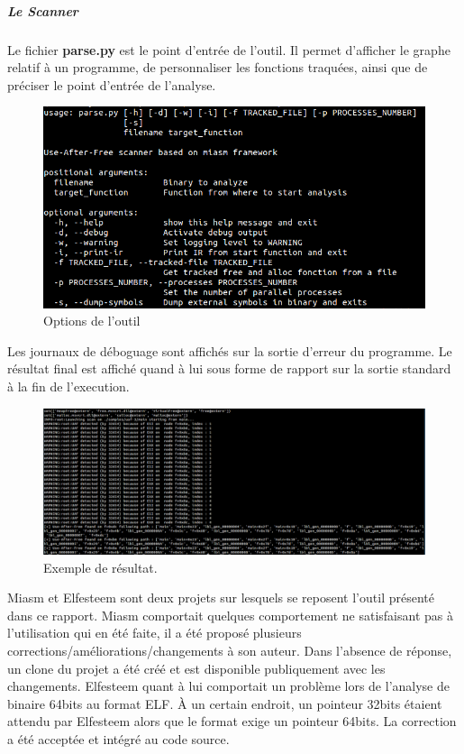 \subparagraph{Le Scanner}
Le fichier \textbf{parse.py} est le point d'entrée de l'outil. Il permet d'afficher le graphe relatif à un programme, de personnaliser les fonctions traquées, ainsi que de préciser
le point d'entrée de l'analyse.
\begin{figure}[h]
    \centering
    \includegraphics[scale=0.3]{options-parse.png}\newline
    \caption{Options de l'outil}
\end{figure}
Les journaux de déboguage sont affichés sur la sortie d'erreur du programme. Le résultat final est affiché quand à lui sous forme de rapport sur la sortie standard à la fin de l'execution.
\begin{figure}[h]
    \centering
    \includegraphics[scale=0.3]{results.png}\newline
    \caption{Exemple de résultat.}
\end{figure}
Miasm et Elfesteem sont deux projets sur lesquels se reposent l'outil présenté dans ce rapport. Miasm comportait quelques comportement ne satisfaisant pas à l'utilisation qui en été faite,
il a été proposé plusieurs corrections/améliorations/changements à son auteur. Dans l'absence de réponse, un clone du projet a été créé et est disponible publiquement avec les changements.
Elfesteem quant à lui comportait un problème lors de l'analyse de binaire 64bits au format ELF. À un certain endroit, un pointeur 32bits étaient attendu par Elfesteem alors que le format
exige un pointeur 64bits. La correction a été acceptée et intégré au code source.

